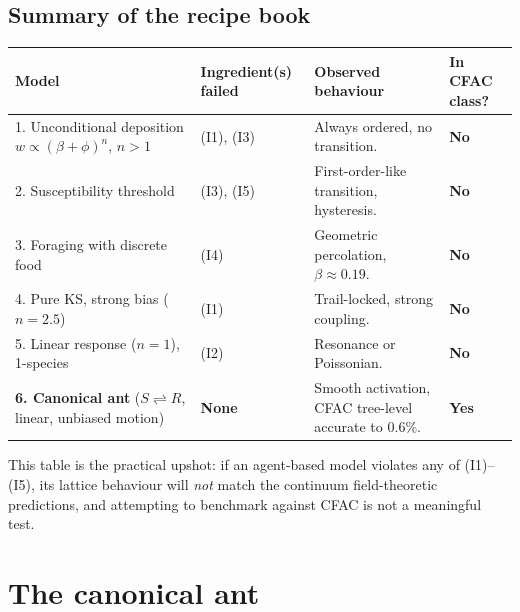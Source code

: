 \documentclass[10pt,a4paper,twocolumn]{article}
\theoremstyle{definition}
\begin{document}
\subsection{Summary of the recipe book}

\begin{table}[t]
\centering
\small
\renewcommand{\arraystretch}{1.25}
\begin{tabular}{@{}p{4.5cm}p{2.5cm}p{6cm}p{2.4cm}@{}}
\toprule
\textbf{Model} & \textbf{Ingredient(s) failed}
  & \textbf{Observed behaviour}
  & \textbf{In CFAC class?} \\
\midrule
1. Unconditional deposition\newline
  $w \propto (\beta+\phi)^n,\,n>1$
  & (I1), (I3)
  & Always ordered, no transition.
  & \textbf{No} \\
\midrule
2. Susceptibility threshold
  & (I3), (I5)
  & First-order-like transition, hysteresis.
  & \textbf{No} \\
\midrule
3. Foraging with discrete food
  & (I4)
  & Geometric percolation,
    $\beta \approx 0.19$.
  & \textbf{No} \\
\midrule
4. Pure KS, strong bias ($n=2.5$)
  & (I1)
  & Trail-locked, strong coupling.
  & \textbf{No} \\
\midrule
5. Linear response ($n=1$), 1-species
  & (I2)
  & Resonance or Poissonian.
  & \textbf{No} \\
\midrule
\textbf{6. Canonical ant}\newline
  ($S\rightleftharpoons R$, linear,\newline
   unbiased motion)
  & \textbf{None}
  & Smooth activation, CFAC
    tree-level accurate to $0.6\%$.
  & \textbf{Yes} \\
\bottomrule
\end{tabular}
\end{table}

This table is the practical upshot: if an agent-based model
violates any of (I1)--(I5), its lattice behaviour will
\emph{not} match the continuum field-theoretic predictions,
and attempting to benchmark against CFAC is not a meaningful
test.

\section{The canonical ant}\label{sec:canonical}
\end{document}
